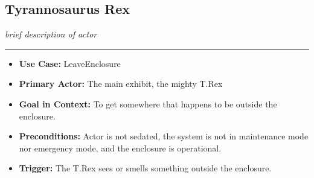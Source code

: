 \documentclass[12pt]{article}
\begin{document}
    \subsection{Tyrannosaurus Rex}
    \textit{brief description of actor}
    \par\noindent\rule{\textwidth}{0.4pt}    
    \begin{itemize}
        \item[]\textbf{Use Case:}
            LeaveEnclosure

        \item[]\textbf{Primary Actor:}
            The main exhibit, the mighty T.Rex

        \item[]\textbf{Goal in Context:}
            To get somewhere that happens to be outside the enclosure.

        \item[]\textbf{Preconditions:}
            Actor is not sedated, the system is not in maintenance mode 
            nor emergency mode, and the enclosure is operational.

        \item[]\textbf{Trigger:}
            The T.Rex sees or smells something outside the enclosure.


\end{itemize}
\end{document}
